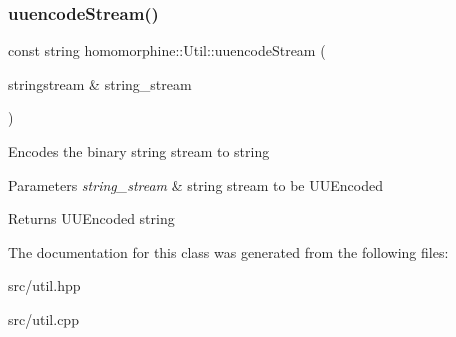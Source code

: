 \subsubsection{\texorpdfstring{uuencodeStream()}{uuencodeStream()}}
{\footnotesize\ttfamily const string homomorphine\+::\+Util\+::uuencode\+Stream (\begin{DoxyParamCaption}\item[{stringstream \&}]{string\+\_\+stream }\end{DoxyParamCaption})\hspace{0.3cm}{\ttfamily [static]}}

Encodes the binary string stream to string


\begin{DoxyParams}{Parameters}
{\em string\+\_\+stream} & string stream to be U\+U\+Encoded \\
\hline
\end{DoxyParams}
\begin{DoxyReturn}{Returns}
U\+U\+Encoded string 
\end{DoxyReturn}


The documentation for this class was generated from the following files\+:\begin{DoxyCompactItemize}
\item 
src/util.\+hpp\item 
src/util.\+cpp\end{DoxyCompactItemize}
